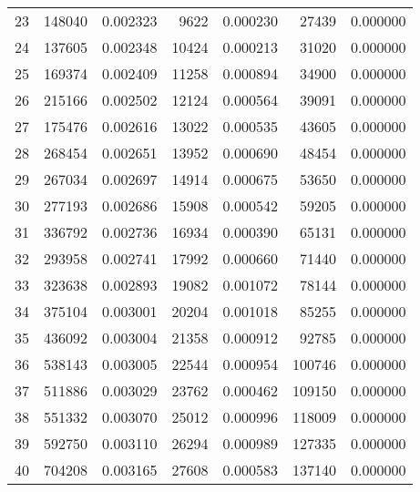 \documentclass[11pt]{article}
\begin{document}
\begin{center}
\begin{tabular}{rrrrrrr}
23 & 148040 & 0.002323 & 9622 & 0.000230 & 27439 & 0.000000\\[0pt]
24 & 137605 & 0.002348 & 10424 & 0.000213 & 31020 & 0.000000\\[0pt]
25 & 169374 & 0.002409 & 11258 & 0.000894 & 34900 & 0.000000\\[0pt]
26 & 215166 & 0.002502 & 12124 & 0.000564 & 39091 & 0.000000\\[0pt]
27 & 175476 & 0.002616 & 13022 & 0.000535 & 43605 & 0.000000\\[0pt]
28 & 268454 & 0.002651 & 13952 & 0.000690 & 48454 & 0.000000\\[0pt]
29 & 267034 & 0.002697 & 14914 & 0.000675 & 53650 & 0.000000\\[0pt]
30 & 277193 & 0.002686 & 15908 & 0.000542 & 59205 & 0.000000\\[0pt]
31 & 336792 & 0.002736 & 16934 & 0.000390 & 65131 & 0.000000\\[0pt]
32 & 293958 & 0.002741 & 17992 & 0.000660 & 71440 & 0.000000\\[0pt]
33 & 323638 & 0.002893 & 19082 & 0.001072 & 78144 & 0.000000\\[0pt]
34 & 375104 & 0.003001 & 20204 & 0.001018 & 85255 & 0.000000\\[0pt]
35 & 436092 & 0.003004 & 21358 & 0.000912 & 92785 & 0.000000\\[0pt]
36 & 538143 & 0.003005 & 22544 & 0.000954 & 100746 & 0.000000\\[0pt]
37 & 511886 & 0.003029 & 23762 & 0.000462 & 109150 & 0.000000\\[0pt]
38 & 551332 & 0.003070 & 25012 & 0.000996 & 118009 & 0.000000\\[0pt]
39 & 592750 & 0.003110 & 26294 & 0.000989 & 127335 & 0.000000\\[0pt]
40 & 704208 & 0.003165 & 27608 & 0.000583 & 137140 & 0.000000\\[0pt]
\end{tabular}
\end{center}
\end{document}
